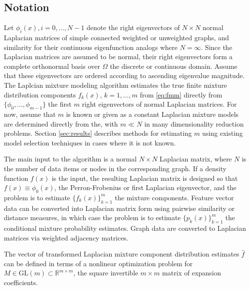 \documentclass[10pt,letterpaper]{article}
\newcommand{\R}{\mathbb{R}}
\begin{document}
\subsection{Notation}
Let $\phi_i(x), i=0, \dots, N-1$ denote the right eigenvectors of $N \times N$ normal Laplacian matrices of simple connected weighted or unweighted graphs, and similarity for their continuous eigenfunction analogs where $N = \infty$.
Since the Laplacian matrices are assumed to be normal, their right eigenvectors form a complete orthonormal basis over $\Omega$ the discrete or continuous domain.
Assume that these eigenvectors are ordered according to ascending eigenvalue magnitude.
The Laplcian mixture modeling algorithm estimates the true finite mixture distribution components $f_k(x)$, $k = 1, \dots, m$ from \eqref{eq:fmm} directly from $\{\phi_0, \dots, \phi_{m - 1}\}$ the first $m$ right eigenvectors of normal Laplacian matrices.
For now, assume that $m$ is known or given as a constant Laplacian mixture models are determined directly from the, with $m \ll N$ in many dimensionality reduction problems. Section \ref{sec:results} describes methods for estimating $m$ using existing model selection techniques in cases where it is not known.

The main input to the algorithm is a normal $N \times N$ Laplacian matrix, where $N$ is the number of data items or nodes in the corresponding graph.
If a density function $f(x)$ is the input, the resulting Laplacian matrix is designed so that $f(x) \equiv \phi_0(x)$, the Perron-Frobenius or first Laplacian eigenvector, and the problem is to estimate $\{f_k(x)\}_{k = 1}^m$ the mixture components.
Feature vector data can be converted into Laplacian matrix form using pairwise similarity or distance measures, in which case the problem is to estimate $\{p_k(x)\}_{k = 1}^m$ the conditional mixture probability estimates.
Graph data are converted to Laplacian matrices via weighted adjacency matrices.

The vector of transformed Laplacian mixture component distribution estimates $\hat f$ can be defined in terms of a nonlinear optimization problem for $M \in \mathrm{GL}(m) \subset \R^{m \times m}$, the square invertible $m \times m$ matrix of expansion coefficients.
\end{document}
